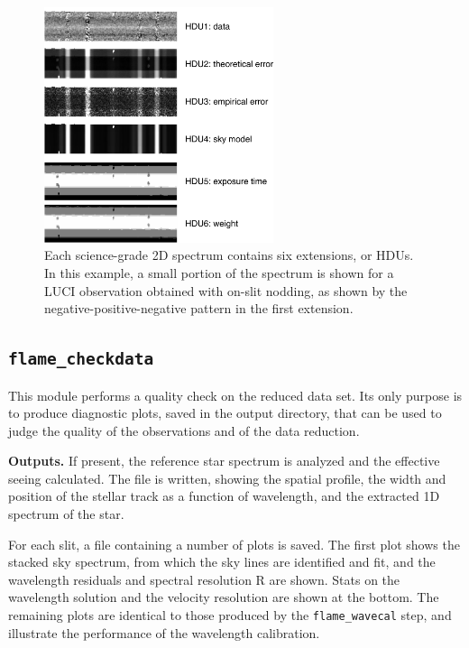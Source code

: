 \documentclass[a4paper]{article}
\begin{document}
\begin{sloppypar}
\begin{figure}[tbp]
\centering
\includegraphics[width=0.6\textwidth]{extensions}
\caption{Each science-grade 2D spectrum contains six extensions, or HDUs. In this example, a small portion of the spectrum is shown for a LUCI observation obtained with on-slit nodding, as shown by the negative-positive-negative pattern in the first extension.}
\label{fig:extensions}
\end{figure}



\subsection{\texttt{flame\_checkdata}}

This module performs a quality check on the reduced data set. Its only purpose is to produce diagnostic plots, saved in the output directory, that can be used to judge the quality of the observations and of the data reduction.

\medskip
\noindent
\textbf{Outputs.} If present, the reference star spectrum is analyzed and the effective seeing calculated. The file  is written, showing the spatial profile, the width and position of the stellar track as a function of wavelength, and the extracted 1D spectrum of the star.

For each slit, a  file containing a number of plots is saved. The first plot shows the stacked sky spectrum, from which the sky lines are identified and fit, and the wavelength residuals and spectral resolution R are shown. Stats on the wavelength solution and the velocity resolution are shown at the bottom. The remaining plots are identical to those produced by the \texttt{flame\_wavecal} step, and illustrate the performance of the wavelength calibration.


\end{sloppypar}
\end{document}
